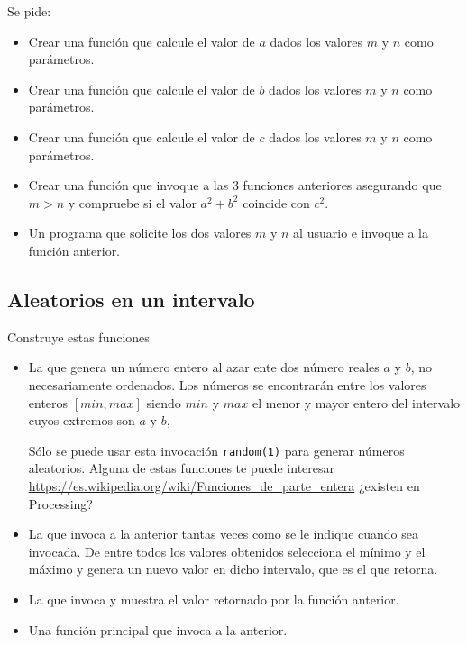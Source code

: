 Se pide:
\begin{itemize}
\item Crear una función que calcule el valor de $a$ dados los valores $m$ y $n$ como parámetros. 
\item Crear una función que calcule el valor de $b$ dados los valores $m$ y $n$ como parámetros. 
\item Crear una función que calcule el valor de $c$ dados los valores $m$ y $n$ como parámetros. 
\item Crear una función que invoque a las 3 funciones anteriores asegurando que $m>n$ y compruebe si el valor $a^2+b^2$ coincide con $c^2$.
\item Un programa que solicite los dos valores $m$ y $n$ al usuario e invoque a la función anterior.
\end{itemize}






\separacion
\subsection{Aleatorios en un intervalo}

Construye estas funciones

\begin{itemize}
\item La que genera un número entero al azar ente dos número reales $a$ y $b$, no necesariamente ordenados.
Los números se encontrarán entre los valores enteros $[min, max]$ siendo $min$ y $max$ el menor y mayor entero del intervalo cuyos extremos son $a$ y $b$,

Sólo se puede usar esta invocación {\tt random(1)} para generar números aleatorios. Alguna de estas funciones te puede interesar \url{https://es.wikipedia.org/wiki/Funciones_de_parte_entera} ¿existen en Processing?

\item La que invoca a la anterior tantas veces como se le indique cuando sea invocada. De entre todos los valores obtenidos selecciona el mínimo y el máximo y genera un nuevo valor en dicho intervalo, que es el que retorna.
\item La que invoca y muestra el valor retornado por la función anterior.
\item Una función principal que invoca a la anterior.
\end{itemize}


